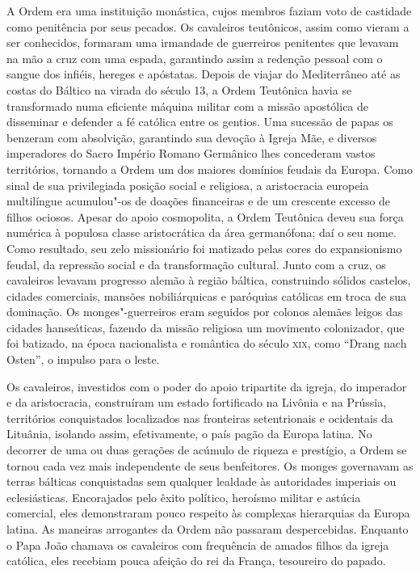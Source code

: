 A Ordem era uma instituição monástica, cujos membros faziam voto de
castidade como penitência por seus pecados. Os cavaleiros teutônicos,
assim como vieram a ser conhecidos, formaram uma irmandade de guerreiros
penitentes que levavam na mão a cruz com uma espada, garantindo assim a
redenção pessoal com o sangue dos infiéis, hereges e apóstatas. Depois
de viajar do Mediterrâneo até as costas do Báltico na virada do século
13, a Ordem Teutônica havia se transformado numa eficiente máquina
militar com a missão apostólica de disseminar e defender a fé católica
entre os gentios. Uma sucessão de papas os benzeram com absolvição,
garantindo sua devoção à Igreja Mãe, e diversos imperadores do Sacro
Império Romano Germânico lhes concederam vastos territórios, tornando a
Ordem um dos maiores domínios feudais da Europa. Como sinal de sua
privilegiada posição social e religiosa, a aristocracia europeia
multilíngue acumulou"-os de doações financeiras e de um crescente excesso
de filhos ociosos. Apesar do apoio cosmopolita, a Ordem Teutônica deveu
sua força numérica à populosa classe aristocrática da área germanófona;
daí o seu nome. Como resultado, seu zelo missionário foi matizado pelas
cores do expansionismo feudal, da repressão social e da transformação
cultural. Junto com a cruz, os cavaleiros levavam progresso alemão à
região báltica, construindo sólidos castelos, cidades comerciais,
mansões nobiliárquicas e paróquias católicas em troca de sua dominação.
Os monges"-guerreiros eram seguidos por colonos alemães leigos das
cidades hanseáticas, fazendo da missão religiosa um movimento
colonizador, que foi batizado, na época nacionalista e romântica do
século \textsc{xix}, como ``Drang nach Osten'', o impulso para o leste.

Os cavaleiros, investidos com o poder do apoio tripartite da igreja, do
imperador e da aristocracia, construíram um estado fortificado na
Livônia e na Prússia, territórios conquistados localizados nas
fronteiras setentrionais e ocidentais da Lituânia, isolando assim,
efetivamente, o país pagão da Europa latina. No decorrer de uma ou duas
gerações de acúmulo de riqueza e prestígio, a Ordem se tornou cada vez
mais independente de seus benfeitores. Os monges governavam as terras
bálticas conquistadas sem qualquer lealdade às autoridades imperiais ou
eclesiásticas. Encorajados pelo êxito político, heroísmo militar e
astúcia comercial, eles demonstraram pouco respeito às complexas
hierarquias da Europa latina. As maneiras arrogantes da Ordem não
passaram despercebidas. Enquanto o Papa João  chamava os cavaleiros
com frequência de amados filhos da igreja católica, eles recebiam pouca
afeição do rei da França, tesoureiro do papado.

